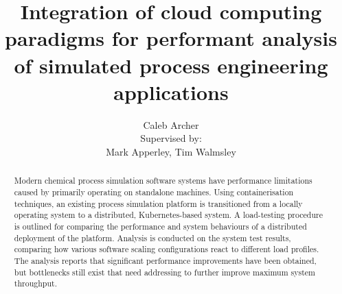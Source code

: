 \documentclass[12pt,a4paper]{uwthesis17}
\title{Integration of cloud computing paradigms for performant analysis of simulated process engineering applications}
\author{
  Caleb Archer \\
  Supervised by: \\
  Mark Apperley, Tim Walmsley
}
\begin{document}

\maketitle

\setcounter{page}{1}

\begin{abstract}

Modern chemical process simulation software systems have performance limitations caused by primarily operating on standalone machines. Using containerisation techniques, an existing process simulation platform is transitioned from a locally operating system to a distributed, Kubernetes-based system. A load-testing procedure is outlined for comparing the performance and system behaviours of a distributed deployment of the platform. Analysis is conducted on the system test results, comparing how various software scaling configurations react to different load profiles. The analysis reports that significant performance improvements have been obtained, but bottlenecks still exist that need addressing to further improve maximum system throughput.

\end{abstract}
\end{document}
